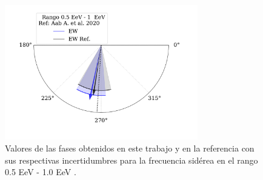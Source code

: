 \begin{figure}[H]
    \begin{small}
        \begin{center}
            \includegraphics[width=0.75\textwidth]{phase_segundo_bin_v2.pdf}
        \end{center}
        \caption{Valores de las fases obtenidos en este trabajo y en la referencia con sus respectivas incertidumbres para la frecuencia sidérea en el  rango 0.5 EeV - 1.0 EeV .}
        \label{fig:segundo}
    \end{small}
\end{figure}

